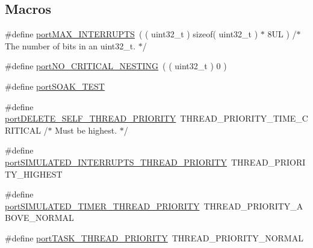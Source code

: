 \subsection*{Macros}
\begin{DoxyCompactItemize}
\item 
\#define \hyperlink{MSVC-MingW_2port_8c_aecc0af206233a1ecf6e7b01daa73591d}{port\-M\-A\-X\-\_\-\-I\-N\-T\-E\-R\-R\-U\-P\-T\-S}~( ( uint32\-\_\-t ) sizeof( uint32\-\_\-t ) $\ast$ 8\-U\-L ) /$\ast$ The number of bits in an uint32\-\_\-t. $\ast$/
\item 
\#define \hyperlink{MSVC-MingW_2port_8c_ab7c7cbbda4fb9a253c7e5086071db162}{port\-N\-O\-\_\-\-C\-R\-I\-T\-I\-C\-A\-L\-\_\-\-N\-E\-S\-T\-I\-N\-G}~( ( uint32\-\_\-t ) 0 )
\item 
\#define \hyperlink{MSVC-MingW_2port_8c_adf1d956ced97ba385b20a5222e43869a}{port\-S\-O\-A\-K\-\_\-\-T\-E\-S\-T}
\item 
\#define \hyperlink{MSVC-MingW_2port_8c_afbc387bb21b715c4e863be795b45cd46}{port\-D\-E\-L\-E\-T\-E\-\_\-\-S\-E\-L\-F\-\_\-\-T\-H\-R\-E\-A\-D\-\_\-\-P\-R\-I\-O\-R\-I\-T\-Y}~T\-H\-R\-E\-A\-D\-\_\-\-P\-R\-I\-O\-R\-I\-T\-Y\-\_\-\-T\-I\-M\-E\-\_\-\-C\-R\-I\-T\-I\-C\-A\-L /$\ast$ Must be highest. $\ast$/
\item 
\#define \hyperlink{MSVC-MingW_2port_8c_a31f6d42078ab01c6c46d81b7b3a4704f}{port\-S\-I\-M\-U\-L\-A\-T\-E\-D\-\_\-\-I\-N\-T\-E\-R\-R\-U\-P\-T\-S\-\_\-\-T\-H\-R\-E\-A\-D\-\_\-\-P\-R\-I\-O\-R\-I\-T\-Y}~T\-H\-R\-E\-A\-D\-\_\-\-P\-R\-I\-O\-R\-I\-T\-Y\-\_\-\-H\-I\-G\-H\-E\-S\-T
\item 
\#define \hyperlink{MSVC-MingW_2port_8c_aef0dc5e5ce01b116dc1d12fb7bde7cef}{port\-S\-I\-M\-U\-L\-A\-T\-E\-D\-\_\-\-T\-I\-M\-E\-R\-\_\-\-T\-H\-R\-E\-A\-D\-\_\-\-P\-R\-I\-O\-R\-I\-T\-Y}~T\-H\-R\-E\-A\-D\-\_\-\-P\-R\-I\-O\-R\-I\-T\-Y\-\_\-\-A\-B\-O\-V\-E\-\_\-\-N\-O\-R\-M\-A\-L
\item 
\#define \hyperlink{MSVC-MingW_2port_8c_ab021565a458c203011a2558d51a88938}{port\-T\-A\-S\-K\-\_\-\-T\-H\-R\-E\-A\-D\-\_\-\-P\-R\-I\-O\-R\-I\-T\-Y}~T\-H\-R\-E\-A\-D\-\_\-\-P\-R\-I\-O\-R\-I\-T\-Y\-\_\-\-N\-O\-R\-M\-A\-L
\end{DoxyCompactItemize}
